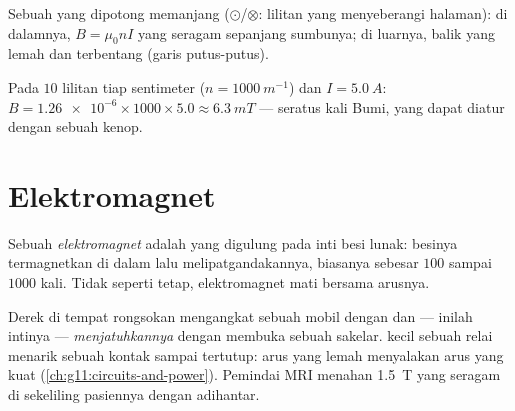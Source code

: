 \begin{omfigure}

{\small Sebuah  yang dipotong memanjang ($\odot$/$\otimes$:
lilitan yang menyeberangi halaman): di dalamnya, $B = \mu_0 n I$ yang
seragam sepanjang sumbunya; di luarnya,  balik yang lemah dan
terbentang (garis putus-putus).}
\end{omfigure}

\begin{example}\label{ex:g11:magnetic-fields:solenoid}
Pada $10$ lilitan tiap sentimeter ($n = \qty{1000}{m^{-1}}$) dan
$I = \qty{5.0}{A}$: $B = \num{1.26e-6} \times 1000 \times 5.0 \approx
\qty{6.3}{mT}$ --- seratus kali  Bumi, yang dapat diatur dengan
sebuah kenop.
\end{example}

\section{Elektromagnet}

\begin{definition}[Elektromagnet]\label{def:g11:magnetic-fields:electromagnet}
Sebuah \emph{elektromagnet} adalah  yang
digulung pada inti besi lunak: besinya termagnetkan di dalam 
 lalu melipatgandakannya, biasanya sebesar $100$ sampai
$1000$ kali. Tidak seperti  tetap, elektromagnet mati bersama
arusnya.
\end{definition}

\begin{remark}\label{rem:g11:magnetic-fields:machines}
Derek di tempat rongsokan mengangkat sebuah mobil dengan 
dan --- inilah intinya --- \emph{menjatuhkannya} dengan membuka sebuah
sakelar.  kecil sebuah relai menarik sebuah kontak sampai
tertutup: arus yang lemah menyalakan arus yang kuat
(\cref{ch:g11:circuits-and-power}). Pemindai MRI menahan
\qty{1.5}{T} yang seragam di sekeliling pasiennya dengan 
adihantar.
\end{remark}

